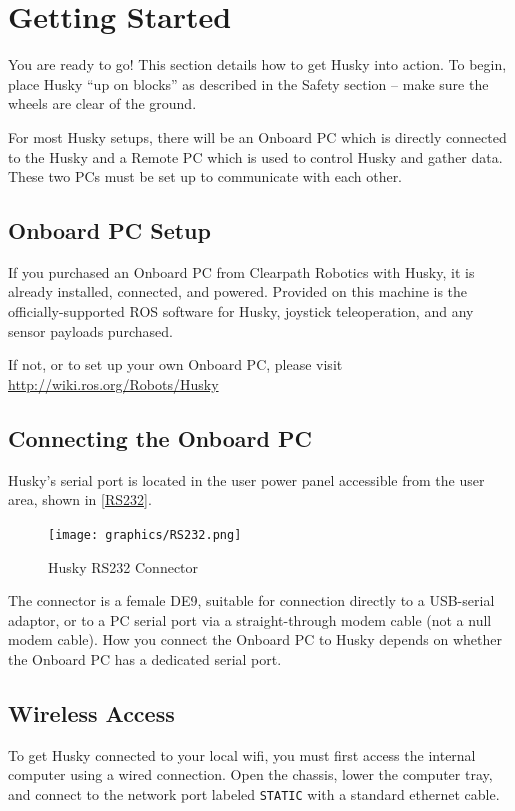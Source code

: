\documentclass[]{clearpath-latex/clearpath-manual}
\begin{document}
\section{Getting Started}

You are ready to go! This section details how to get Husky into action.
To begin, place Husky “up on blocks” as described in the Safety section – make sure the wheels are clear of the ground.

For most Husky setups, there will be an Onboard PC which is directly connected to the Husky and a Remote PC which is used to control Husky and gather data. These two PCs must be set up to communicate with each other.


\subsection{Onboard PC Setup}

If you purchased an Onboard PC from Clearpath Robotics with Husky, it is already installed, connected, and powered.
Provided on this machine is the officially-supported ROS software for Husky, joystick teleoperation, and any sensor payloads purchased.

If not, or to set up your own Onboard PC, please visit \url{http://wiki.ros.org/Robots/Husky}


\subsection{Connecting the Onboard PC}

Husky’s serial port is located in the user power panel accessible from the user area, shown in \autoref{RS232}.

\begin{figure}[h]
	\centering
	\texttt{[image: graphics/RS232.png]}
	\caption{Husky RS232 Connector}
	\label{RS232}
\end{figure}

The connector is a female DE9, suitable for connection directly to a USB-serial adaptor,
or to a PC serial port via a straight-through modem cable (not a null modem cable).
How you connect the Onboard PC to Husky depends on whether the Onboard PC has a dedicated serial port.

\subsection{Wireless Access}

To get Husky connected to your local wifi, you must first access the internal computer
using a wired connection. Open the chassis, lower the computer tray, and connect to the network port
labeled \lstinline{STATIC} with a standard ethernet cable.
\end{document}
